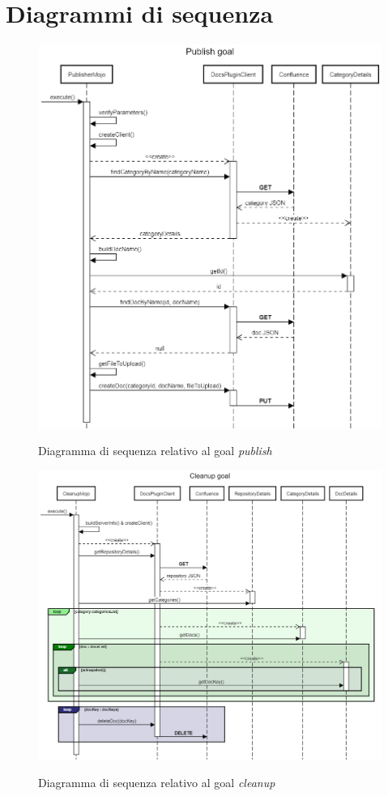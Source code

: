 \section{Diagrammi di sequenza}
\label{sec:diagrammi-sequenza}

\begin{figure}[H]
    \centering
    \includegraphics[width=\textwidth]{immagini/CreateDocSequence.png}\\
    \caption{Diagramma di sequenza relativo al goal \emph{publish}}
\end{figure}

\begin{figure}[H]
    \centering
    \includegraphics[width=\textwidth]{immagini/SequenceCleanupConfluence.png}\\
    \caption{Diagramma di sequenza relativo al goal \emph{cleanup}}
\end{figure}

